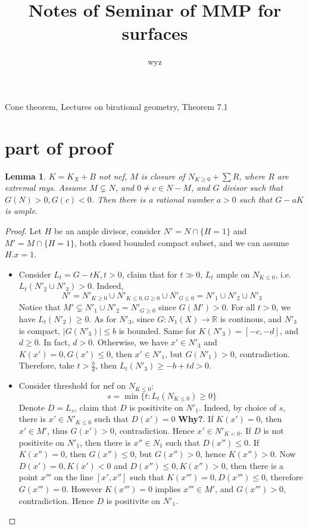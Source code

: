 \documentclass{article}
\title{Notes of Seminar of MMP for surfaces}
\author{wyz}
\date{}
\newtheorem{lem}[defn]{Lemma}
\begin{document}
	 Cone theorem, Lectures on birational geometry, Theorem 7.1
\section{part of proof}
\begin{lem}
	$ K=K_X+B $ not nef, $ M $ is closure of $  N_{K\geqslant 0}+\sum R $, where $ R $ are extremal rays. Assume $ M\subsetneq N $, and $ 0\neq c\in N-M $, and $ G $ divisor such that $ G(N)>0,G(c)<0 $. Then there is a rational number $ a>0 $ such that $ G-aK $ is ample.
\end{lem}

\begin{proof}
	Let $ H $ be an ample divisor, consider $ N'=N\cap \{H=1\} $ and $ M'=M\cap \{H=1\} $, both closed bounded compact subset, and we can assume $ H.x=1 $. 
	\begin{itemize}
		\item Consider $ L_t=G-tK, t>0 $, claim that for $ t\gg 0 $, $ L_t $ ample on $ N_{K\leqslant 0} $, i.e. $ L_t(N'_2 \cup N'_3)>0 $. Indeed, 
		$$ N'=N'_{K\geqslant 0}\cup N'_{K\leqslant 0,G\geqslant 0}\cup N'_{G\leqslant 0}=N'_1\cup N'_2 \cup N'_3 $$
		Notice that $ M'\subsetneq N'_1\cup N'_2=N'_{G\geqslant 0} $ since $ G(M')>0 $. For all $ t>0 $, we have $ L_t(N'_2)\geqslant0 $. As for $ N'_3 $, since $ G:N_1(X)\to \mathbb{R} $ is continous, and $ N'_3 $ is compact, $ |G(N'_3)|\leqslant b $ is bounded. Same for $ K(N'_3)=[-c,-d] $, and $ d\geqslant 0 $. In fact, $ d>0 $. Otherwise, we have $ x'\in N'_3 $ and $ K(x')=0, G(x')\leqslant 0 $, then $ x'\in N'_1 $, but $ G(N'_1)>0 $, contradiction. Therefore, take $ t> \frac{b}{d} $, then $ L_t(N'_3)\geqslant -b+td>0 $.
		\item 	Consider threshold for nef on $ N_{K\leqslant 0} $:
		$$ s=\min \{t: L_t(N_{K\leqslant 0})\geqslant0  \} $$
		Denote $ D=L_s $, claim that $ D $ is positivite on $ N'_1 $. Indeed, by choice of $ s $, there is $ x'\in N'_{K\leqslant 0} $ such that $ D(x')=0 $ \textbf{Why?}. If $ K(x')=0 $, then $ x'\in M' $, thus $ G(x')>0 $, contradiction. Hence $ x'\in N'_{K<0} $. If $ D $ is not positivite on $ N'_1 $, then there is $ x''\in N_1 $ such that $ D(x'')\leqslant 0 $. If $ K(x'')=0 $, then $ G(x'')\leqslant 0 $, but $ G(x'')>0 $, hence $ K(x'')>0 $. Now $ D(x')=0,K(x')<0 $ and $ D(x'')\leqslant 0,K(x'')>0 $, then there is  a point $ x''' $ on the line $ [x',x''] $ such that  $ K(x''')=0,D(x''')\leqslant 0 $,  therefore $ G(x''')=0 $. However $ K(x''')=0 $ implies $ x'''\in M' $, and $ G(x''')>0 $, contradiction. Hence $ D $ is positivite on $ N'_1 $.

\end{itemize}
\end{proof}
\end{document}
